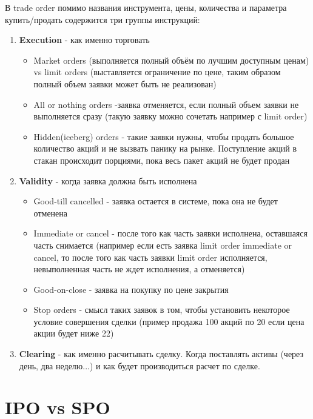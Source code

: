 \documentclass{article}
\begin{document}
 В trade order помимо названия инструмента, цены, количества и параметра купить/продать содержится три группы инструкций:
 \begin{enumerate}
     \item \textbf{Execution} - как именно торговать
     \begin{itemize}
         \item Market orders  (выполняется полный объём по лучшим доступным ценам) vs limit orders (выставляется ограничение по цене, таким образом полный объем заявки может быть не реализован)
         \item All or nothing orders -заявка отменяется, если полный объем заявки не выполняется сразу (такую заявку можно сочетать например с limit order) 
         \item Hidden(iceberg) orders - такие заявки нужны, чтобы продать большое количество акций и не вызвать панику на рынке. Поступление акций в стакан происходит порциями, пока весь пакет акций не будет продан
     \end{itemize}
     \item \textbf{Validity} - когда заявка должна быть исполнена
     \begin{itemize}
         \item Good-till cancelled - заявка остается в системе, пока она не будет отменена
         \item Immediate or cancel - после того как часть заявки исполнена, оставшаяся часть снимается (например если есть заявка limit order immediate or cancel, то после того как часть заявки limit order исполняется, невыполненная часть не ждет исполнения, а отменяется)
         \item Good-on-close - заявка на покупку по цене закрытия
         \item Stop orders - смысл таких заявок в том, чтобы установить некоторое условие совершения сделки (пример продажа 100 акций по 20 если цена акции будет ниже 22)
     \end{itemize}
     \item \textbf{Clearing} - как именно расчитывать сделку. Когда поставлять активы (через день, два неделю...) и как будет производиться расчет по сделке.
     
 \end{enumerate}
 
 \section{IPO vs SPO}
 
\end{document}
